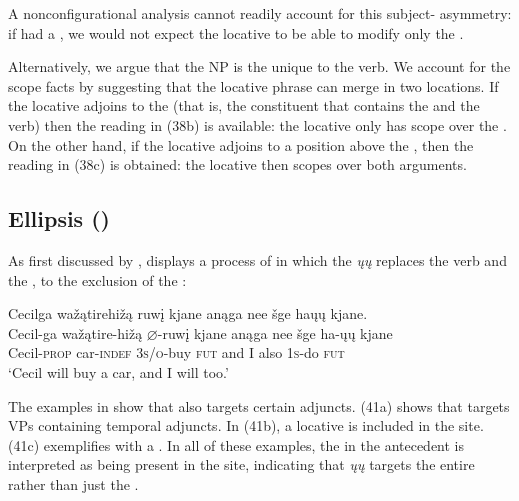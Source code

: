 \documentclass[output=paper]{LSP/langsci}
\begin{document}
A nonconfigurational analysis cannot readily account for this subject- asymmetry: if  had a , we would not expect the locative to be able to modify only the .
	
Alternatively, we argue that the  NP is the unique  to the verb. We account for the scope facts by suggesting that the locative phrase can merge in two locations. If the locative adjoins to the  (that is, the constituent that contains the  and the verb) then the reading in (38b) is available: the locative only has scope over the . On the other hand, if the locative adjoins to a position above the , then the reading in (38c) is obtained: the locative then scopes over both arguments.

\subsection{ Ellipsis ()}

As first discussed by \citet{Johnson2013},  displays a process of  in which the  \textit{\k{u}\k{u}} replaces the verb and the , to the exclusion of the  :

\begin{exe}
\ex\label{ex:jrs:40} 
\glll Cecilga	wa\v{z}ątirehi\v{z}ą		ruw\k{i}	kjane		anąga	nee		\v{s}ge		ha\k{u}\k{u}			kjane.\\
Cecil-ga	wa\v{z}ątire-hi\v{z}ą	$\varnothing$-ruw\k{i}		kjane		anąga	nee	\v{s}ge ha-\k{u}\k{u}		kjane \\
Cecil-\textsc{prop}		car-\textsc{indef}			\textsc{3s/o}-buy		\textsc{fut}	and	I	also	\textsc{1s}-do	\textsc{fut} \\
\trans `Cecil will buy a car, and I will too.'
\end{exe}

The examples in  show that  also targets certain adjuncts. (41a) shows that  targets VPs containing temporal adjuncts. In (41b), a locative  is included in the  site. (41c) exemplifies  with a . In all of these examples, the  in the antecedent  is interpreted as being present in the  site, indicating that \textit{\k{u}\k{u}} targets the entire  rather than just the .
\end{document}
